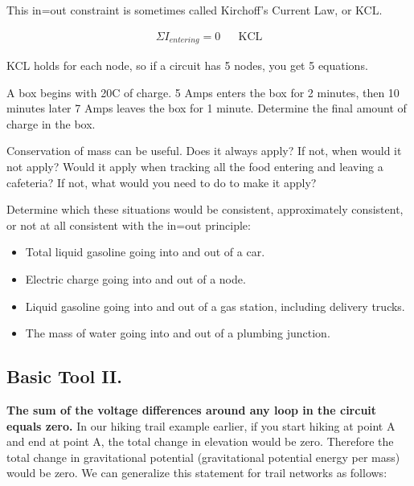 \par

\par
This in=out constraint is sometimes called Kirchoff's Current Law, or KCL.
\par
\begin{align*}
\Sigma I_{entering}=0	&&\text{KCL}
\end{align*}

KCL holds for each node, so if a circuit has 5 nodes, you get 5 equations.

\begin{blevel}
A box begins with 20C of charge. 5 Amps enters the box for 2 minutes, then 10 minutes later 7 Amps leaves the box for 1 minute. Determine the final amount of charge in the box.
\end{blevel}

\begin{dlevel}
Conservation of mass can be useful. Does it always apply? If not, when would it not apply? Would it apply when tracking all the food entering and leaving a cafeteria? If not, what would you need to do to make it apply?
\end{dlevel}

\begin{blevel}
Determine which these situations would be consistent, approximately consistent, or not at all consistent with the in=out principle:
\begin{itemize}
\item Total liquid gasoline going into and out of a car.
\item Electric charge going into and out of a node.
\item Liquid gasoline going into and out of a gas station, including delivery trucks.
\item The mass of water going into and out of a plumbing junction.
\end{itemize}
\end{blevel}

\subsection{Basic Tool II. }
\textbf{The sum of the voltage differences around any loop in the circuit equals zero.} In our hiking trail example earlier, if you start hiking at point A and end at point A, the total change in elevation would be zero. Therefore the total change in gravitational potential (gravitational potential energy per mass) would be zero. We can generalize this statement for trail networks as follows:
\par

